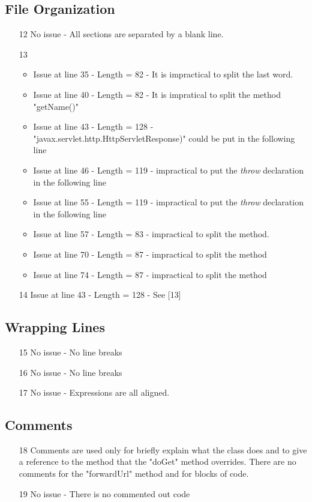 \subsection{File Organization}
\begin{itemize}
\item[12] No issue - All sections are separated by a blank line.
\item[13] \begin{itemize}
\item Issue at line 35 - Length = 82 - It is impractical to split the last word.
\item Issue at line 40 - Length = 82 - It is impratical to split the method "getName()"
\item Issue at line 43 - Length = 128 - "javax.servlet.http.HttpServletResponse)" could be put in the following line
\item Issue at line 46 - Length = 119 - impractical to put the \textit{throw} declaration in the following line
\item Issue at line 55 - Length = 119 - impractical to put the \textit{throw} declaration in the following line
\item Issue at line 57 - Length = 83 - impractical to split the method.
\item Issue at line 70 - Length = 87 - impractical to split the method
\item Issue at line 74 - Length = 87 - impractical to split the method
\end{itemize}
\item[14] Issue at line 43 - Length = 128 - See [13]
\end{itemize}
\subsection{Wrapping Lines}
\begin{itemize}
\item[15] No issue - No line breaks
\item[16] No issue - No line breaks
\item[17] No issue - Expressions are all aligned.
\end{itemize}
\subsection{Comments}
\begin{itemize}
\item[18] Comments are used only for briefly explain what the class does and to give a reference to the method that the "doGet" method overrides. There are no comments for the "forwardUrl" method and for blocks of code.
\item[19] No issue - There is no commented out code 
\end{itemize}
